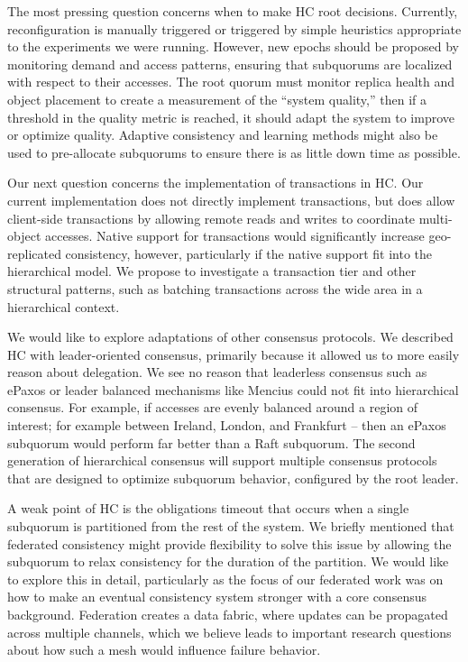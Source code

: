 The most pressing question concerns when to make HC root decisions.
Currently, reconfiguration is manually triggered or triggered by simple heuristics appropriate to the experiments we were running.
However, new epochs should be proposed by monitoring demand and access patterns, ensuring that subquorums are localized with respect to their accesses.
The root quorum must monitor replica health and object placement to create a measurement of the ``system quality,'' then if a threshold in the quality metric is reached, it should adapt the system to improve or optimize quality.
Adaptive consistency and learning methods might also be used to pre-allocate subquorums to ensure there is as little down time as possible.

Our next question concerns the implementation of transactions in HC.
Our current implementation does not directly implement transactions, but does allow client-side transactions by allowing remote reads and writes to coordinate multi-object accesses.
Native support for transactions would significantly increase geo-replicated consistency, however, particularly if the native support fit into the hierarchical model.
We propose to investigate a transaction tier and other structural patterns, such as batching transactions across the wide area in a hierarchical context.

We would like to explore adaptations of other consensus protocols.
We described HC with leader-oriented consensus, primarily because it allowed us to more easily reason about delegation.
We see no reason that leaderless consensus such as ePaxos or leader balanced mechanisms like Mencius could not fit into hierarchical consensus.
For example, if accesses are evenly balanced around a region of interest; for example between Ireland, London, and Frankfurt -- then an ePaxos subquorum would perform far better than a Raft subquorum.
The second generation of hierarchical consensus will support multiple consensus protocols that are designed to optimize subquorum behavior, configured by the root leader.

A weak point of HC is the obligations timeout that occurs when a single subquorum is partitioned from the rest of the system.
We briefly mentioned that federated consistency might provide flexibility to solve this issue by allowing the subquorum to relax consistency for the duration of the partition.
We would like to explore this in detail, particularly as the focus of our federated work was on how to make an eventual consistency system stronger with a core consensus background.
Federation creates a data fabric, where updates can be propagated across multiple channels, which we believe leads to important research questions about how such a mesh would influence failure behavior.

